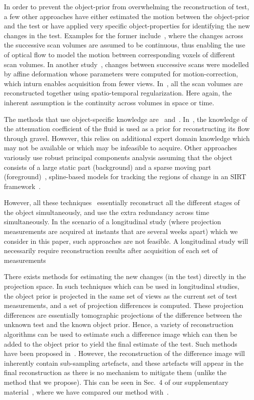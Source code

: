 \documentclass[journal]{IEEEtran}
\begin{document}
In order to prevent the object-prior from overwhelming the
reconstruction of test, a few other approaches have either estimated the
motion between the object-prior and the test or have applied very
specific object-properties for identifying the new changes in the
test.  Examples for the former include~\cite{koen2020}, where the
changes across the successive scan volumes are assumed to be
continuous, thus enabling the use of optical flow to model the motion
between corresponding voxels of different scan volumes. In another
study~\cite{vincent2017}, changes between successive scans were
modelled by affine deformation whose parameters were computed for
motion-correction, which inturn enables acquisition from fewer
views. In~\cite{daniil2015}, all the scan volumes are reconstructed
together using spatio-temporal regularization. Here again, the
inherent assumption is the continuity across volumes in space or
time.

The methods that use object-specific knowledge
are~\cite{Van2015} and~\cite{Marjolein2016}.  In~\cite{Van2015}, the
knowledge of the attenuation coefficient of the fluid is used as a
prior for reconstructing its flow through gravel. However, this relies
on additional expert domain knowledge which may not be available or
which may be infeasible to acquire. Other approaches variously use robust principal components
analysis assuming that the object consists of a large static part
(background) and a sparse moving part (foreground)~\cite{HaoGao},
spline-based models for tracking the regions of change in an SIRT
framework~\cite{Van2014}.

However, all these
techniques~\cite{daniil2015,koen2020,Van2015,HaoGao,Van2014}
essentially reconstruct all the different stages of the object
simultaneously, and use the extra redundancy across time
simultaneously. In the scenario of a longitudinal study (where
projection measurements are acquired at instants that are several
weeks apart) which we consider in this paper, such approaches are not
feasible. A longitudinal study will necessarily require reconstruction
results after acquisition of each set of measurements

There exists methods for estimating the new changes (in the test)
directly in the projection space. In such techniques which can
be used in longitudinal studies, the object prior
is projected in the same set of views as the current set of test
measurements, and a set of projection differences is computed. These
projection differences are essentially tomographic projections of the
difference between the unknown test and the known object prior. Hence,
a variety of reconstruction algorithms can be used to estimate such a
difference image which can then be added to the object prior to yield
the final estimate of the test. Such methods have been proposed
in~\cite{Pourmorteza2015,Lee2012}. However, the reconstruction of the
difference image will inherently contain sub-sampling artefacts, and
these artefacts will appear in the final reconstruction as there is no
mechanism to mitigate them (unlike the method that we propose). This
can be seen in Sec.~4 of our supplementary material~\cite{supp_paper},
where we have compared our method with~\cite{Lee2012}.
\end{document}
